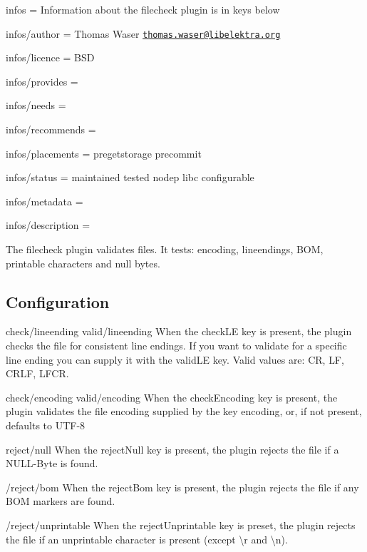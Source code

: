 
\begin{DoxyItemize}
\item infos = Information about the filecheck plugin is in keys below
\item infos/author = Thomas Waser \href{mailto:thomas.waser@libelektra.org}{\tt thomas.\+waser@libelektra.\+org}
\item infos/licence = B\+S\+D
\item infos/provides =
\item infos/needs =
\item infos/recommends =
\item infos/placements = pregetstorage precommit
\item infos/status = maintained tested nodep libc configurable
\item infos/metadata =
\item infos/description =
\end{DoxyItemize}

The filecheck plugin validates files. It tests\+: encoding, lineendings, B\+O\+M, printable characters and null bytes.

\subsection*{Configuration}

{\ttfamily check/lineending} {\ttfamily valid/lineending} When the {\ttfamily check\+L\+E} key is present, the plugin checks the file for consistent line endings. If you want to validate for a specific line ending you can supply it with the {\ttfamily valid\+L\+E} key. Valid values are\+: {\ttfamily C\+R}, {\ttfamily L\+F}, {\ttfamily C\+R\+L\+F}, {\ttfamily L\+F\+C\+R}.

{\ttfamily check/encoding} {\ttfamily valid/encoding} When the {\ttfamily check\+Encoding} key is present, the plugin validates the file encoding supplied by the key {\ttfamily encoding}, or, if not present, defaults to {\ttfamily U\+T\+F-\/8}

{\ttfamily reject/null} When the {\ttfamily reject\+Null} key is present, the plugin rejects the file if a N\+U\+L\+L-\/\+Byte is found.

{\ttfamily /reject/bom} When the {\ttfamily reject\+Bom} key is present, the plugin rejects the file if any B\+O\+M markers are found.

{\ttfamily /reject/unprintable} When the {\ttfamily reject\+Unprintable} key is preset, the plugin rejects the file if an unprintable character is present (except {\ttfamily \textbackslash{}r} and {\ttfamily \textbackslash{}n}). 